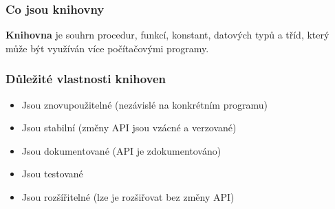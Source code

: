 \begin{frame}
    \frametitle[Knihovny]{Co jsou knihovny}
    \begin{definition}
        \textbf{Knihovna} je souhrn procedur, funkcí, konstant, datových typů a tříd, který může být využíván více počítačovými programy.\cite{wikipedia:knihovna}
    \end{definition}
\end{frame}

\begin{frame}
    \frametitle[Vlastnosti knihoven]{Důležité vlastnosti knihoven}
    \begin{itemize}
        \item <1-> Jsou znovupoužitelné (nezávislé na konkrétním programu)
        \item <2-> Jsou stabilní (změny API jsou vzácné a verzované)
        \item <3-> Jsou dokumentované (API je zdokumentováno)
        \item <4-> Jsou testované
        \item <5-> Jsou rozšířitelné (lze je rozšiřovat bez změny API)
    \end{itemize}
\end{frame}